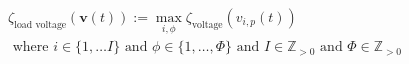 \begin{equation}
\begin{split}
	\zeta_\text{load voltage}(\textbf{v}(t)) := \max_{i,\phi}{\zeta_\text{voltage}(v_{i,p}(t))} \\
	\text{ where } i \in \{1, \dots I\} \text{ and } \phi \in \{1, \dots, \Phi\} \text{ and } I \in \mathbb{Z}_{>0} \text{ and } \Phi \in \mathbb{Z}_{>0}
\end{split}
\label{ch1:equ:load-voltage-deviation}
\end{equation}
